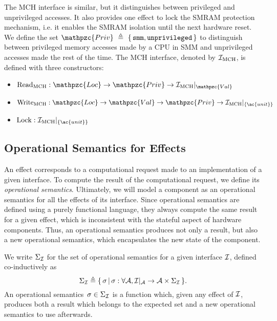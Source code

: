 \begin{example}
  The MCH interface is similar, but it distinguishes between privileged and
  unprivileged accesses.
  It also provides one effect to lock the SMRAM protection mechanism, i.e. it
  enables the SMRAM isolation until the next hardware reset.
  We define the set
  $\mathpzc{Priv}~\triangleq~\{\,\val{smm}, \val{unprivileged}\,\}$ to
  distinguish between privileged memory accesses made by a CPU in SMM and
  unprivileged accesses made the rest of the time.
  The MCH interface, denoted by $\mathcal{I}_{\mathrm{MCH}}$, is defined with three
  constructors:
  \begin{itemize}
  \item
    $\func{Read}_{\mathrm{MCH}} : \mathpzc{Loc} \rightarrow \mathpzc{Priv}
    \rightarrow \Interface{\I_{\mathrm{MCH}}}{\mathpzc{Val}}$
  \item
    $\func{Write}_{\mathrm{MCH}} : \mathpzc{Loc} \rightarrow \mathpzc{Val}
    \rightarrow \mathpzc{Priv} \rightarrow
    \Interface{\I_{\mathrm{MCH}}}{\{\ac{unit}\}}$
  \item $\func{Lock} : \Interface{\I_{\mathrm{MCH}}}{\{\ac{unit}\}}$
  \end{itemize}
\end{example}

\subsection{Operational Semantics for Effects}

An effect corresponds to a computational request made to an implementation of a
given interface.
%
To compute the result of the computational request, we define its
\emph{operational semantics}.
%
Ultimately, we will model a component as an operational semantics for all the
effects of its interface.
%
Since operational semantics are defined using a purely functional language, they
always compute the same result for a given effect, which is inconsistent with
the stateful aspect of hardware components.
%
Thus, an operational semantics produces not only a result, but also a new
operational semantics, which encapsulates the new state of the component.

\begin{definition}
  We write $\Sigma_{\mathcal{I}}$ for the set of operational semantics for a given
  interface $\mathcal{I}$, defined co-inductively as
  \[
    \Sigma_{\mathcal{I}} \triangleq \{\,\sigma\,|\,\sigma : \forall \mathcal{A},
    \mathcal{I}|_{\mathcal{A}} \rightarrow \mathcal{A} \times \Sigma_{\mathcal{I}} \,\}.
  \]
  An operational semantics~$\sigma \in \Sigma_{\mathcal{I}}$ is a function which, given
  any effect of $\mathcal{I}$, produces both a result which belongs to the expected set
  and a new operational semantics to use afterwards.
\end{definition}


